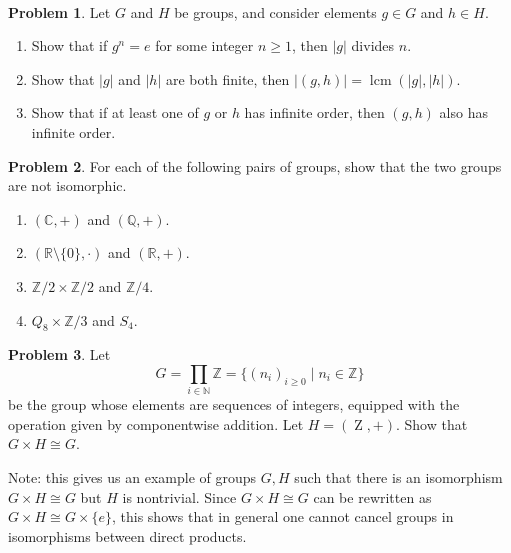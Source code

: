 \documentclass[11pt]{article}
\DeclareMathOperator{\lcm}{lcm}
\newcommand{\C}{\mathbb{C}}
\newcommand{\Q}{\mathbb{Q}}
\newcommand{\R}{\mathbb{R}}
\newcommand{\N}{\mathbb{N}}
\DeclareMathOperator{\Z}{Z}
\newcommand{\ZZ}{\mathbb{Z}}
\theoremstyle{definition}
\newtheorem{problem}{Problem}
\begin{document}
 
\ 
 
\begin{problem}
	Let $G$ and $H$ be groups, and consider elements $g \in G$ and $h \in H$.

\vspace{-0.2em}

\begin{enumerate}[label=2.\arabic*.]

\item\label{order divides} Show that if $g^n = e$ for some integer $n \geqslant 1$, then $|g|$ divides $n$.

\item\label{order of pairs} Show that $|g|$ and $|h|$ are both finite, then $|(g,h)| = \lcm(|g|,|h|)$.


\item Show that if at least one of $g$ or $h$ has infinite order, then $(g,h)$ also has infinite order.

\end{enumerate}
\end{problem}
 


\begin{problem}
For each of the following pairs of groups, show that the two groups are not isomorphic.

\begin{enumerate}[label=3.\arabic*.,itemsep=0.5em]
\item $(\C, +)$ and $(\Q, +)$.
  
\item $(\R \setminus \{0\}, \cdot)$ and $(\R, +)$.

\item $\ZZ/2 \times \ZZ/2$ and $\ZZ/4$.

\item $Q_8 \times \ZZ/3$ and $S_4$.

\end{enumerate}
\end{problem} 





\begin{problem}
Let 
$$G=\prod_{i\in \N} \ZZ = \{ (n_i)_{i \geqslant 0} \mid n_i \in \ZZ \}$$ 
be the group whose elements are sequences of integers, equipped with the operation given by componentwise addition. Let $H=(\Z,+)$. Show that $G\times H \cong G$.
\end{problem}

\noindent
Note: this gives us an example of groups $G,H$ such that there is an isomorphism $G\times H\cong G$ but $H$ is nontrivial. Since $G\times H \cong G$ can be rewritten as $G\times H\cong G\times \{e\}$, this shows that in general one cannot cancel groups in isomorphisms between direct products.
\end{document}
